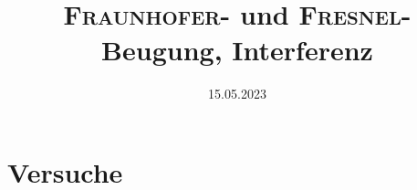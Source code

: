 
\usepackage{subfiles}

\title{\texorpdfstring{\textsc{Fraunhofer}}{FRAUNHOFER}- und \texorpdfstring{\textsc{Fresnel}}{FRESNEL}-Beugung, Interferenz}
\date{15.05.2023}


\maketitle


\newpage

\newpage
\part{Versuche}

\newpage

